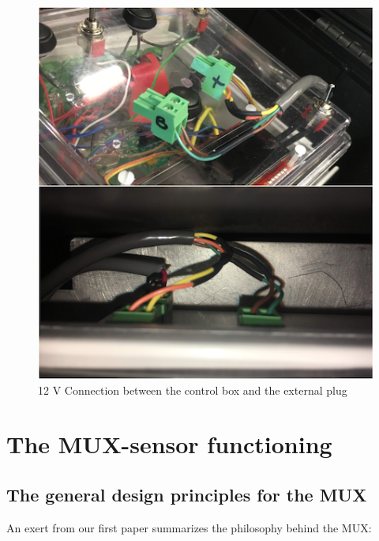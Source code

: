 \documentclass[]{book}
\begin{document}
\begin{figure}

{\centering \includegraphics[width=0.8\linewidth]{pictures/ControlBoxConnectionValveRS485} 

}

\caption{12 V Connection between the control box and the external plug}\label{fig:ControlBoxConnectionValveRS485}
\end{figure}

\hypertarget{the-mux-sensor-functioning}{%
\chapter{The MUX-sensor functioning}\label{the-mux-sensor-functioning}}

\hypertarget{the-general-design-principles-for-the-mux}{%
\section{The general design principles for the MUX}\label{the-general-design-principles-for-the-mux}}

An exert from our first paper \citep{Birgand2016-to} summarizes the philosophy behind the MUX:
\end{document}
